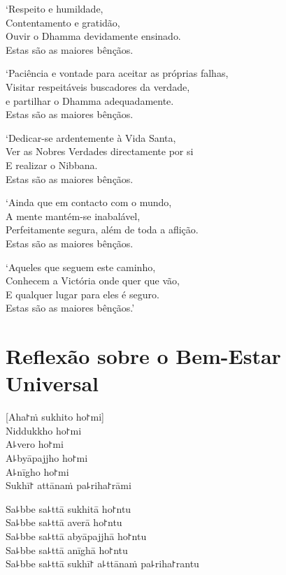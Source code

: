 `Respeito e humildade,\\
Contentamento e gratidão,\\
Ouvir o Dhamma devidamente ensinado.\\
Estas são as maiores bênçãos.

`Paciência e vontade para aceitar as próprias falhas,\\
Visitar respeitáveis buscadores da verdade,\\
e partilhar o Dhamma adequadamente.\\
Estas são as maiores bênçãos.

\clearpage

`Dedicar-se ardentemente à Vida Santa,\\
Ver as Nobres Verdades directamente por si\\
E realizar o Nibbana.\\
Estas são as maiores bênçãos.

`Ainda que em contacto com o mundo,\\
A mente mantém-se inabalável,\\
Perfeitamente segura, além de toda a aflição.\\
Estas são as maiores bênçãos.

`Aqueles que seguem este caminho,\\
Conhecem a Victória onde quer que vão,\\
E qualquer lugar para eles é seguro.\\
Estas são as maiores bênçãos.'

\chapter*[Bem-Estar Universal]{Reflexão sobre o Bem-Estar Universal}

\delegateSetUseNext


\begin{leader}
\end{leader}

[Aha꜓ṁ sukhito ho꜓mi]\\
Niddukkho ho꜓mi\\
A꜕vero ho꜓mi\\
A꜕byāpajjho ho꜓mi\\
A꜕nīgho ho꜓mi\\
Sukhī꜓ attānaṁ pa꜕riha꜓rāmi

Sa꜕bbe sa꜕ttā sukhitā ho꜓ntu\\
Sa꜕bbe sa꜕ttā averā ho꜓ntu\\
Sa꜕bbe sa꜕ttā abyāpajjhā ho꜓ntu\\
Sa꜕bbe sa꜕ttā anīghā ho꜓ntu\\
Sa꜕bbe sa꜕ttā sukhī꜓ a꜕ttānaṁ pa꜕riha꜓rantu

